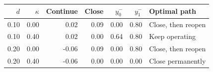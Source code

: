 \begin{tabular}{@{}rrrrrrl@{}}\toprule
$d$ & $\kappa$ & Continue & Close & $y^-_0$ & $y^-_1$ & Optimal path \\\midrule
0.10 & 0.00 & 0.02 & 0.09 & 0.00 & 0.80 & Close, then reopen \\
0.10 & 0.40 & 0.02 & 0.00 & 0.64 & 0.80 & Keep operating \\
0.20 & 0.00 & -0.06 & 0.09 & 0.00 & 0.80 & Close, then reopen \\
0.20 & 0.40 & -0.06 & 0.00 & 0.00 & 0.00 & Close permanently \\
\bottomrule\end{tabular}
